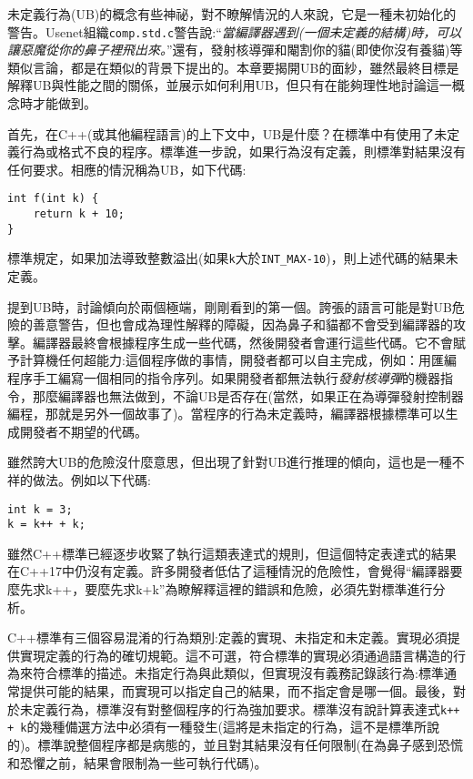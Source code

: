 未定義行為(UB)的概念有些神祕，對不瞭解情況的人來說，它是一種未初始化的警告。Usenet組織\texttt{comp.std.c}警告說:“\textit{當編譯器遇到(一個未定義的結構)時，可以讓惡魔從你的鼻子裡飛出來。}”還有，發射核導彈和閹割你的貓(即使你沒有養貓)等類似言論，都是在類似的背景下提出的。本章要揭開UB的面紗，雖然最終目標是解釋UB與性能之間的關係，並展示如何利用UB，但只有在能夠理性地討論這一概念時才能做到。

首先，在C++(或其他編程語言)的上下文中，UB是什麼？在標準中有使用了未定義行為或格式不良的程序。標準進一步說，如果行為沒有定義，則標準對結果沒有任何要求。相應的情況稱為UB，如下代碼:

\begin{lstlisting}[style=styleCXX]
int f(int k) {
	return k + 10;
}
\end{lstlisting}

標準規定，如果加法導致整數溢出(如果\texttt{k}大於\texttt{INT\_MAX-10})，則上述代碼的結果未定義。

提到UB時，討論傾向於兩個極端，剛剛看到的第一個。誇張的語言可能是對UB危險的善意警告，但也會成為理性解釋的障礙，因為鼻子和貓都不會受到編譯器的攻擊。編譯器最終會根據程序生成一些代碼，然後開發者會運行這些代碼。它不會賦予計算機任何超能力:這個程序做的事情，開發者都可以自主完成，例如：用匯編程序手工編寫一個相同的指令序列。如果開發者都無法執行\textit{發射核導彈}的機器指令，那麼編譯器也無法做到，不論UB是否存在(當然，如果正在為導彈發射控制器編程，那就是另外一個故事了)。當程序的行為未定義時，編譯器根據標準可以生成開發者不期望的代碼。

雖然誇大UB的危險沒什麼意思，但出現了針對UB進行推理的傾向，這也是一種不祥的做法。例如以下代碼:

\begin{lstlisting}[style=styleCXX]
int k = 3;
k = k++ + k;
\end{lstlisting}

雖然C++標準已經逐步收緊了執行這類表達式的規則，但這個特定表達式的結果在C++17中仍沒有定義。許多開發者低估了這種情況的危險性，會覺得“編譯器要麼先求k++，要麼先求k+k”為瞭解釋這裡的錯誤和危險，必須先對標準進行分析。

C++標準有三個容易混淆的行為類別:定義的實現、未指定和未定義。實現必須提供實現定義的行為的確切規範。這不可選，符合標準的實現必須通過語言構造的行為來符合標準的描述。未指定行為與此類似，但實現沒有義務記錄該行為:標準通常提供可能的結果，而實現可以指定自己的結果，而不指定會是哪一個。最後，對於未定義行為，標準沒有對整個程序的行為強加要求。標準沒有說計算表達式\texttt{k++ + k}的幾種備選方法中必須有一種發生(這將是未指定的行為，這不是標準所說的)。標準說整個程序都是病態的，並且對其結果沒有任何限制(在為鼻子感到恐慌和恐懼之前，結果會限制為一些可執行代碼)。

